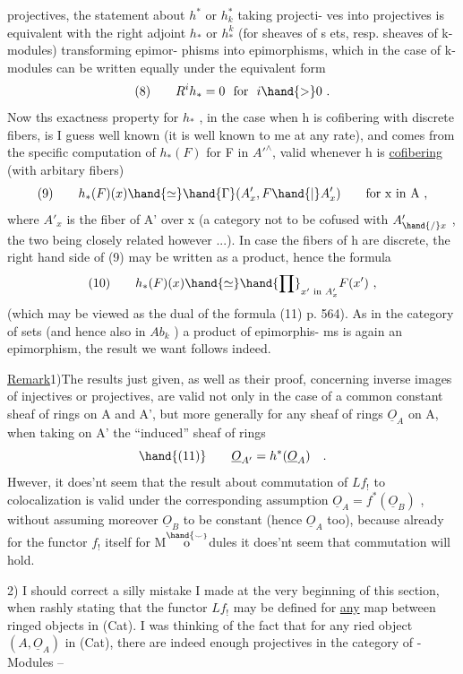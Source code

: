 projectives,  the statement about  $h^{*}$ or $h^{*}_{k}$ taking projecti-%
ves into projectives is equivalent with the right adjoint $h_{*}$ or $h^{k}_{*}$
(for sheaves of s ets,  resp. sheaves of k-modules) transforming epimor-%
phisms into epimorphisms,  which in the case of k-modules can be
written equally under the equivalent form
\[ (8) \qquad R^{i}h_{*} = 0 \ \text{ for } \ i \hand{>} 0 \ . \]
Now ths exactness property for $h_{*}$ ,  in the case when h is cofibering
with discrete fibers, is I guess well known (it is well known to me
at any rate),  and comes from the specific computation of $h_{*}(F)$ for
F in $A'^{\wedge}$,  valid whenever h is \uline{cofibering} (with arbitary fibers)
\[ (9) \qquad h_{*}(F)(x) \hand{\simeq} \hand{\Gamma}(A'_{x}, F\hand{|}A'_{x}) \qquad \text{for x in A ,} \]
where $A'_{x}$ is the fiber of A' over x (a category not to be cofused with
$A'_{\hand{/}x}$ ,  the two being closely related however ...).  In case the fibers
of h are discrete,  the right hand side of (9) may be written as a
product,  hence the formula
\[ (10) \qquad h_{*}(F)(x) \hand{\simeq} \hand{\prod}_{x' \text{ in } A'_{x}} F(x') \ , \]
(which may be viewed as the dual of the formula (11) p. 564).  As in
the category of sets (and hence also in  $Ab_{k}$ ) a product of epimorphis-%
ms is again an epimorphism,  the result we want follows indeed.

\uline{Remark}1)The results just given,  as well as their proof,  concerning
inverse images of injectives or projectives,  are valid not only in
the case of a  common constant sheaf of rings on A and
A',  but more generally for any sheaf of rings $\underline{O}_{A}$ on A,  when taking
on A' the ``induced'' sheaf of rings
\[ \hand{(11)} \qquad \underline{O}_{A'} = h^{*}(\underline{O}_{A}) \quad . \]
Hwever,  it does'nt seem that the result about commutation of $Lf_{!}$
to colocalization is valid under the corresponding assumption
$\underline{O}_{A} = f^{*}(\underline{O}_{B})$ ,  without assuming moreover $\underline{O}_{B}$  to be constant
(hence $\underline{O}_{A}$ too),  because already for the functor $f_{!}$ itself for M$\overset{\hand{\scriptscriptstyle\smile}}{\mathrm{o}}$dules\hand{,}
it does'nt seem that commutation will hold.

2)  I should correct a silly mistake I made at the very beginning
of this section,  when rashly stating that the functor $Lf_{!}$  may be
defined for \uline{any} map  between ringed objects in (Cat).  I was thinking
of the fact that for any ried object $(A,\underline{O}_{A})$  in (Cat),  there are
indeed enough projectives in the category of -Modules  --

